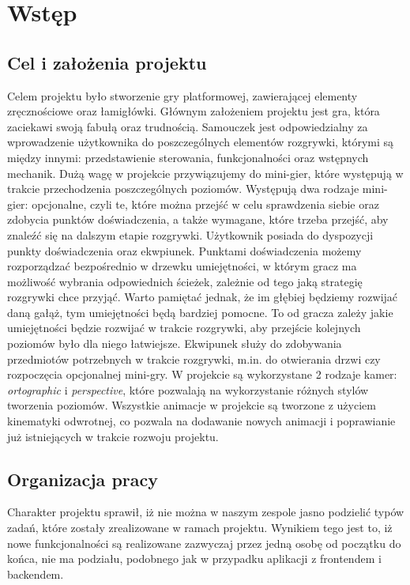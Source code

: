 \documentclass[oneside,polski,logo]{amuthesis}
\begin{document}

\chapter{Wstęp}
\section{Cel i założenia projektu}
Celem projektu było stworzenie gry platformowej, zawierającej elementy zręcznościowe oraz łamigłówki. Głównym założeniem projektu jest gra, która zaciekawi swoją fabułą oraz trudnością. Samouczek jest odpowiedzialny za wprowadzenie użytkownika do poszczególnych elementów rozgrywki, którymi są między innymi: przedstawienie sterowania, funkcjonalności oraz wstępnych mechanik. Dużą wagę w projekcie przywiązujemy do mini-gier, które występują w trakcie przechodzenia poszczególnych poziomów. Występują dwa rodzaje mini-gier: opcjonalne, czyli te, które można przejść w celu sprawdzenia siebie oraz zdobycia punktów doświadczenia, a także wymagane, które trzeba przejść, aby znaleźć się na dalszym etapie rozgrywki. Użytkownik posiada do dyspozycji punkty doświadczenia oraz ekwpiunek. Punktami doświadczenia możemy rozporządzać bezpośrednio w drzewku umiejętności, w którym gracz ma możliwość wybrania odpowiednich ścieżek, zależnie od tego jaką strategię rozgrywki chce przyjąć. Warto pamiętać jednak, że im głębiej będziemy rozwijać daną gałąż, tym umiejętności będą bardziej pomocne. To od gracza zależy jakie umiejętności będzie rozwijać w trakcie rozgrywki, aby przejście kolejnych poziomów było dla niego łatwiejsze. Ekwipunek służy do zdobywania przedmiotów potrzebnych w trakcie rozgrywki, m.in. do otwierania drzwi czy rozpoczęcia opcjonalnej mini-gry. W projekcie są wykorzystane 2 rodzaje kamer: \emph{ortographic} i \emph{perspective}, które pozwalają na wykorzystanie różnych stylów tworzenia poziomów. Wszystkie animacje w projekcie są tworzone z użyciem kinematyki odwrotnej, co pozwala na dodawanie nowych animacji i poprawianie już istniejących w trakcie rozwoju projektu.
\section{Organizacja pracy}
Charakter projektu sprawił, iż nie można w naszym zespole jasno podzielić typów zadań, które zostały zrealizowane w ramach projektu. Wynikiem tego jest to, iż nowe funkcjonalności są realizowane zazwyczaj przez jedną osobę od początku do końca, nie ma podziału, podobnego jak w przypadku aplikacji z frontendem i backendem.
\end{document}
